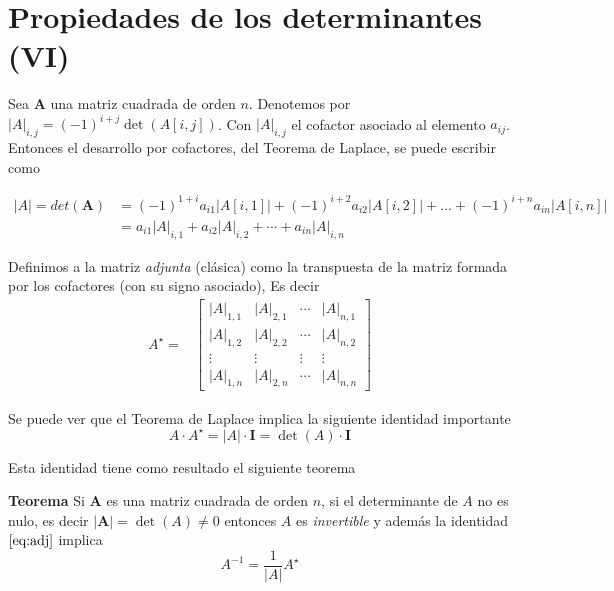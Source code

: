\documentclass[
]{article}
\begin{document}
\hypertarget{propiedades-de-los-determinantes-vi}{%
\section{Propiedades de los determinantes
(VI)}\label{propiedades-de-los-determinantes-vi}}

Sea \(\mathbf{A}\) una matriz cuadrada de orden \(n\). Denotemos por
\(|A|_{i,j} = (-1)^{i+j}\det(A[i,j])\). Con \(|A|_{i,j}\) el cofactor
asociado al elemento \(a_{ij}\). Entonces el desarrollo por cofactores,
del Teorema de Laplace, se puede escribir como

\begin{equation}
\begin{array}{cc}
\left| A \right| = det(\mathbf{A}) &=  (-1)^{1+i}a_{i1}|A[i,1]| +(-1)^{i+2} a_{i2}|A[i,2]| + \ldots +(-1)^{i+n} a_{in}|A[i,n]| \\
                                   & = a_{i1}|A|_{i,1}+a_{i2}|A|_{i,2}+ \cdots + a_{in}|A|_{i,n}
\end{array}
\end{equation}

Definimos a la matriz \emph{adjunta} (clásica) como la transpuesta de la
matriz formada por los cofactores (con su signo asociado), Es decir
\begin{equation}
\begin{array}{cc}
  A^{\star} =& \begin{bmatrix}
            |A|_{1,1}      &|A|_{2,1}    & \cdots     & |A|_{n,1}      \\ 
            |A|_{1,2}      &|A|_{2,2}    & \cdots     & |A|_{n,2}      \\
            \vdots         & \vdots      & \vdots     & \vdots \\  
            |A|_{1,n}      &|A|_{2,n}    & \cdots     & |A|_{n,n} 
   \end{bmatrix}
\end{array}
\end{equation}

Se puede ver que el Teorema de Laplace implica la siguiente identidad
importante \begin{equation}\label{eq:adj}
A\cdot A^{\star} = |A|\cdot \mathbf{I} =\det(A)\cdot \mathbf{I} 
\end{equation}

Esta identidad tiene como resultado el siguiente teorema

\textbf{Teorema} Si \(\mathbf{A}\) es una matriz cuadrada de orden
\(n\), si el determinante de \(A\) no es nulo, es decir
\(|\mathbf{A}|=\det(A) \ne 0\) entonces \(A\) es \emph{invertible} y
además la identidad \(\eqref{eq:adj}\) implica \begin{equation}
A^{-1} = \frac{1}{|A|} A^{\star}
\end{equation}
\end{document}
